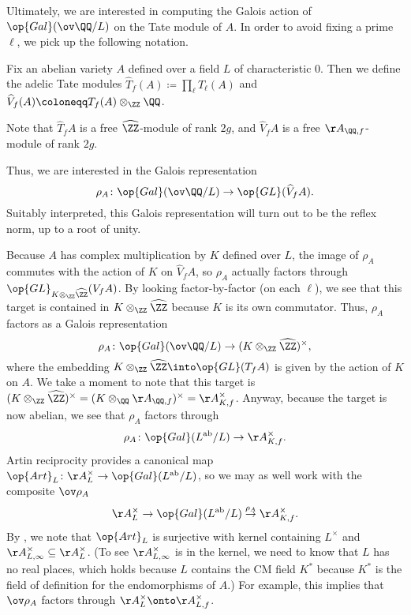 \documentclass[../thesis.tex]{subfiles}
\begin{document}
Ultimately, we are interested in computing the Galois action of $\op{Gal}(\ov\QQ/L)$ on the Tate module of $A$. In order to avoid fixing a prime $\ell$, we pick up the following notation.
\begin{notation}
	Fix an abelian variety $A$ defined over a field $L$ of characteristic $0$. Then we define the adelic Tate modules $\widehat T_f(A)\coloneqq\prod_\ell T_\ell(A)$ and $\widehat V_f(A)\coloneqq T_f(A)\otimes_\ZZ\QQ$.
\end{notation}
\begin{remark}
	Note that $\widehat T_fA$ is a free $\widehat\ZZ$-module of rank $2g$, and $\widehat V_fA$ is a free $\AA_{\QQ,f}$-module of rank $2g$.
\end{remark}
Thus, we are interested in the Galois representation
\[\rho_A\colon\op{Gal}(\ov\QQ/L)\to\op{GL}(\widehat V_fA).\]
Suitably interpreted, this Galois representation will turn out to be the reflex norm, up to a root of unity.

Because $A$ has complex multiplication by $K$ defined over $L$, the image of $\rho_A$ commutes with the action of $K$ on $\widehat V_fA$, so $\rho_A$ actually factors through $\op{GL}_{K\otimes_\ZZ\widehat\ZZ}(V_fA)$. By looking factor-by-factor (on each $\ell$), we see that this target is contained in $K\otimes_\ZZ\widehat\ZZ$ because $K$ is its own commutator. Thus, $\rho_A$ factors as a Galois representation
\[\rho_A\colon\op{Gal}(\ov\QQ/L)\to(K\otimes_\ZZ\widehat\ZZ)^\times,\]
where the embedding $K\otimes_\ZZ\widehat\ZZ\into\op{GL}(T_fA)$ is given by the action of $K$ on $A$. We take a moment to note that this target is $(K\otimes_\ZZ\widehat\ZZ)^\times=(K\otimes_\QQ\AA_{\QQ,f})^\times=\AA_{K,f}^\times$. Anyway, because the target is now abelian, we see that $\rho_A$ factors through
\[\rho_A\colon\op{Gal}(L^{\mathrm{ab}}/L)\to\AA_{K,f}^\times.\]
Artin reciprocity provides a canonical map $\op{Art}_L\colon\AA_L^\times\to\op{Gal}(L^{\mathrm{ab}}/L)$, so we may as well work with the composite $\ov\rho_A$
\[\AA_L^\times\to\op{Gal}(L^{\mathrm{ab}}/L)\stackrel{\rho_A}\to\AA_{K,f}^\times.\]
By \cite[Corollary~8.2.2]{neukirch-cohom}, we note that $\op{Art}_L$ is surjective with kernel containing $L^\times$ and $\AA_{L,\infty}^\times\subseteq\AA_L^\times$. (To see $\AA_{L,\infty}^\times$ is in the kernel, we need to know that $L$ has no real places, which holds because $L$ contains the CM field $K^*$ because $K^*$ is the field of definition for the endomorphisms of $A$.) For example,  this implies that $\ov\rho_A$ factors through $\AA_L^\times\onto\AA_{L,f}^\times$.
\end{document}
